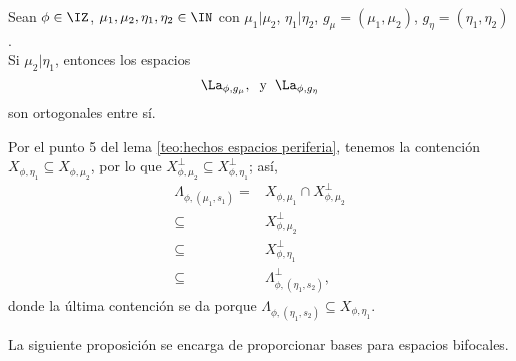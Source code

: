 \begin{prop} \label{prop: ortogonalidad de espacios Y} 
Sean $\phi \in \IZ$, $\mu_{1}, \mu_{2}, \eta_{1}, \eta_{2} \in \IN$
con $\mu_{1} | \mu_{2}$, $\eta_{1} | \eta_{2}$,
$g_{\mu}=(\mu_{1}, \mu_{2})$,
$g_{\eta}=(\eta_{1}, \eta_{2})$. \\
Si $\mu_{2} | \eta_{1}$, entonces los espacios 
\[
\La_{\phi, g_{\mu}}, \hspace{0.2cm} \text{y} \hspace{0.2cm}
\La_{\phi, g_{\eta}}
\]
son ortogonales entre sí.
\end{prop}
\begin{dem} 
Por el punto 5 del lema
\ref{teo:hechos espacios periferia}, tenemos la
contención $X_{\phi, \eta_{1}} \subseteq X_{\phi, \mu_{2}}$,
por lo que 
$X_{\phi, \mu_{2}}^{\perp} \subseteq X_{\phi, \eta_{1}}^{\perp}$;
así,
\begin{align*}
\Lambda_{\phi, (\mu_{1}, s_{1})} = & 
X_{\phi, \mu_{1}} \cap X_{\phi, \mu_{2}}^{\perp} \\
\subseteq &  X_{\phi, \mu_{2}}^{\perp} \\
\subseteq &  X_{\phi, \eta_{1}}^{\perp} \\
\subseteq &  \Lambda_{\phi, (\eta_{1}, s_{2})}^{\perp},
\end{align*}
donde la última contención se da porque
$\Lambda_{\phi, (\eta_{1}, s_{2})} \subseteq X_{\phi, \eta_{1}}$.
\QEDB
\end{dem}



La siguiente proposición se encarga de proporcionar
bases para espacios bifocales.

